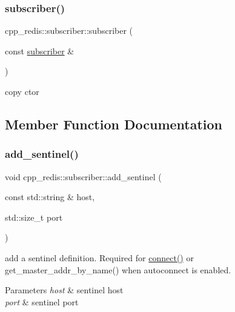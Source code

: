 \subsubsection{\texorpdfstring{subscriber()}{subscriber()}\hspace{0.1cm}{\footnotesize\ttfamily [3/3]}}
{\footnotesize\ttfamily cpp\+\_\+redis\+::subscriber\+::subscriber (\begin{DoxyParamCaption}\item[{const \hyperlink{classcpp__redis_1_1subscriber}{subscriber} \&}]{ }\end{DoxyParamCaption})\hspace{0.3cm}{\ttfamily [delete]}}



copy ctor 



\subsection{Member Function Documentation}
\mbox{\label{classcpp__redis_1_1subscriber_a10584e201abe4e701b70d078b3a676fc}} 
\subsubsection{\texorpdfstring{add\+\_\+sentinel()}{add\_sentinel()}}
{\footnotesize\ttfamily void cpp\+\_\+redis\+::subscriber\+::add\+\_\+sentinel (\begin{DoxyParamCaption}\item[{const std\+::string \&}]{host,  }\item[{std\+::size\+\_\+t}]{port }\end{DoxyParamCaption})}

add a sentinel definition. Required for \hyperlink{classcpp__redis_1_1subscriber_a6ae8134a9a9b31d6f2434ec4f6e86d3a}{connect()} or get\+\_\+master\+\_\+addr\+\_\+by\+\_\+name() when autoconnect is enabled.


\begin{DoxyParams}{Parameters}
{\em host} & sentinel host \\
\hline
{\em port} & sentinel port \\
\hline
\end{DoxyParams}
\mbox{\label{classcpp__redis_1_1subscriber_a7b4564fc4dfe356b95aeae4fdb8071c9}} 
